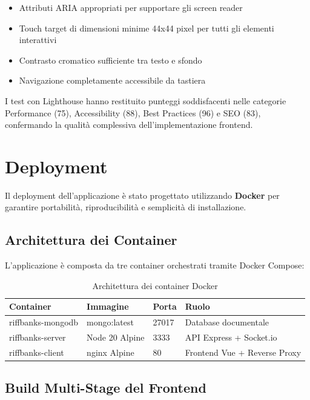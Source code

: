 \documentclass{report}
\begin{document}
\begin{itemize}
    \item Attributi ARIA appropriati per supportare gli screen reader
    \item Touch target di dimensioni minime 44x44 pixel per tutti gli elementi interattivi
    \item Contrasto cromatico sufficiente tra testo e sfondo
    \item Navigazione completamente accessibile da tastiera
\end{itemize}

I test con Lighthouse hanno restituito punteggi soddisfacenti nelle categorie Performance (75), Accessibility (88), Best Practices (96) e SEO (83), confermando la qualità complessiva dell'implementazione frontend.


\chapter{Deployment}

Il deployment dell'applicazione è stato progettato utilizzando \textbf{Docker} per garantire portabilità, riproducibilità e semplicità di installazione.

\section{Architettura dei Container}

L'applicazione è composta da tre container orchestrati tramite Docker Compose:

\begin{table}[H]
\centering
\begin{tabular}{llll}
\toprule
\textbf{Container} & \textbf{Immagine} & \textbf{Porta} & \textbf{Ruolo} \\
\midrule
riffbanks-mongodb & mongo:latest & 27017 & Database documentale \\
riffbanks-server & Node 20 Alpine & 3333 & API Express + Socket.io \\
riffbanks-client & nginx Alpine & 80 & Frontend Vue + Reverse Proxy \\
\bottomrule
\end{tabular}
\caption{Architettura dei container Docker}
\end{table}

\section{Build Multi-Stage del Frontend}
\end{document}
